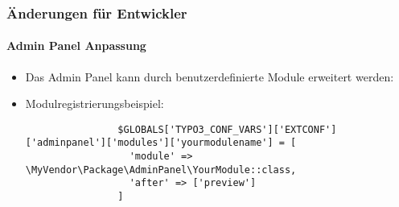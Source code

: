 
\begin{frame}[fragile,label=AdminPanelCustomization]
	\frametitle{Änderungen für Entwickler}
	\framesubtitle{Admin Panel Anpassung}

	\lstset{basicstyle=\tiny\ttfamily}

	\begin{itemize}
		\item Das Admin Panel kann durch benutzerdefinierte Module erweitert werden:
		\item Modulregistrierungsbeispiel:

			\begin{lstlisting}
				$GLOBALS['TYPO3_CONF_VARS']['EXTCONF']['adminpanel']['modules']['yourmodulename'] = [
				  'module' => \MyVendor\Package\AdminPanel\YourModule::class,
				  'after' => ['preview']
				]
			\end{lstlisting}

	\end{itemize}

\end{frame}

